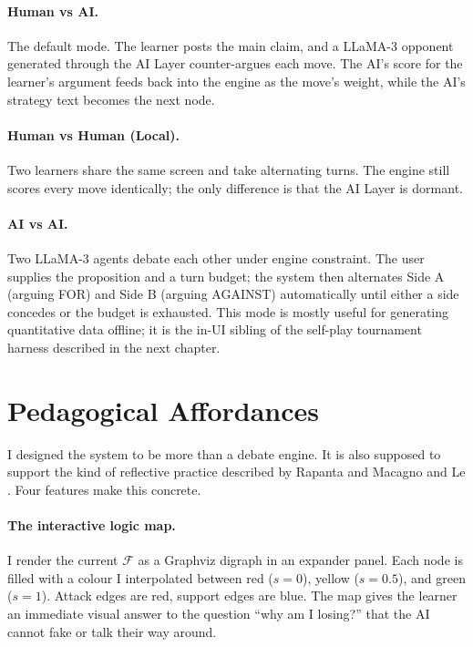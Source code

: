 \paragraph{Human vs AI.} The default mode. The learner posts the main claim, and a LLaMA-3 opponent generated through the AI Layer counter-argues each move. The AI's score for the learner's argument feeds back into the engine as the move's weight, while the AI's strategy text becomes the next node.

\paragraph{Human vs Human (Local).} Two learners share the same screen and take alternating turns. The engine still scores every move identically; the only difference is that the AI Layer is dormant.

\paragraph{AI vs AI.} Two LLaMA-3 agents debate each other under engine constraint. The user supplies the proposition and a turn budget; the system then alternates Side A (arguing FOR) and Side B (arguing AGAINST) automatically until either a side concedes or the budget is exhausted. This mode is mostly useful for generating quantitative data offline; it is the in-UI sibling of the self-play tournament harness described in the next chapter.

\section{Pedagogical Affordances}
I designed the system to be more than a debate engine. It is also supposed to support the kind of reflective practice described by Rapanta and Macagno \cite{rapanta2019argumentation} and Le \cite{le2019technology}. Four features make this concrete.

\paragraph{The interactive logic map.} I render the current $\mathcal{F}$ as a Graphviz \cite{ellson2002graphviz} digraph in an expander panel. Each node is filled with a colour I interpolated between red ($s = 0$), yellow ($s = 0.5$), and green ($s = 1$). Attack edges are red, support edges are blue. The map gives the learner an immediate visual answer to the question ``why am I losing?'' that the AI cannot fake or talk their way around.

